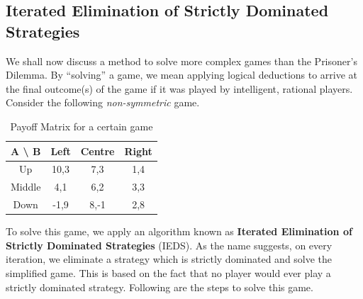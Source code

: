 \documentclass{article}
\theoremstyle{definition}
\begin{document}
\subsection{Iterated Elimination of Strictly Dominated Strategies}

We shall now discuss a method to solve more complex games than the Prisoner's Dilemma. By ``solving'' a game, we mean applying logical deductions to arrive at the final outcome(s) of the game if it was played by intelligent, rational players. Consider the following \textit{non-symmetric} game. \medskip
\begin{table}[H]
    \begin{adjustbox}{width=6cm,center}
    \begin{tabular}{|c|c|c|c|}
        \hline
        A \textbackslash \: B & Left & Centre & Right \\
        \hline
        Up & 10,3 & 7,3 & 1,4 \\
        \hline 
        Middle & 4,1 & 6,2 & 3,3 \\
        \hline
        Down & -1,9 & 8,-1 & 2,8\\
        \hline
    \end{tabular}
    \end{adjustbox}
    \caption{Payoff Matrix for a certain game}
    \label{table:iesds}
\end{table}

To solve this game, we apply an algorithm known as \textbf{Iterated Elimination of Strictly Dominated Strategies} (IEDS). As the name suggests, on every iteration, we eliminate a strategy which is strictly dominated and solve the simplified game. This is based on the fact that no player would ever play a strictly dominated strategy. Following are the steps to solve this game. 
\end{document}
